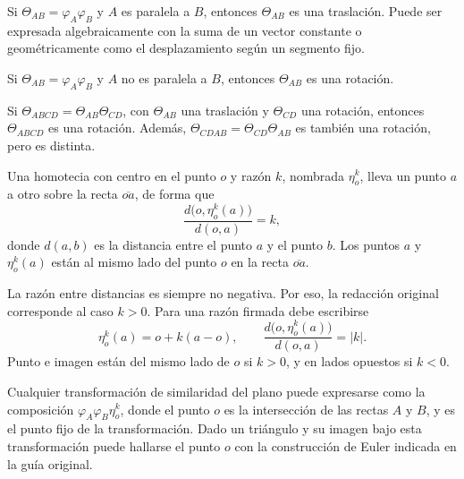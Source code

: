 \begin{enunciado}[Teorema 3]
Si \(\Theta_{AB}=\varphi_A\varphi_B\) y \(A\) es paralela a \(B\), entonces
\(\Theta_{AB}\) es una traslación. Puede ser expresada algebraicamente con la suma de un
vector constante o geométricamente como el desplazamiento según un segmento fijo.
\end{enunciado}

\begin{enunciado}[Teorema 4]
Si \(\Theta_{AB}=\varphi_A\varphi_B\) y \(A\) no es paralela a \(B\), entonces
\(\Theta_{AB}\) es una rotación.
\end{enunciado}

\begin{enunciado}[Teorema 5]
Si \(\Theta_{ABCD}=\Theta_{AB}\Theta_{CD}\), con \(\Theta_{AB}\) una traslación y
\(\Theta_{CD}\) una rotación, entonces \(\Theta_{ABCD}\) es una rotación. Además,
\(\Theta_{CDAB}=\Theta_{CD}\Theta_{AB}\) es también una rotación, pero es distinta.
\end{enunciado}

\begin{enunciado}[Definición 3]
Una homotecia con centro en el punto \(o\) y razón \(k\), nombrada \(\eta_o^k\), lleva un
punto \(a\) a otro sobre la recta \(\overline{oa}\), de forma que
\[
  \frac{d\bigl(o,\eta_o^k(a)\bigr)}{d(o,a)}=k,
\]
donde \(d(a,b)\) es la distancia entre el punto \(a\) y el punto \(b\). Los puntos \(a\) y
\(\eta_o^k(a)\) están al mismo lado del punto \(o\) en la recta \(\overline{oa}\).
\end{enunciado}

\begin{atencion}
La razón entre distancias es siempre no negativa. Por eso, la redacción original corresponde
al caso \(k>0\). Para una razón firmada debe escribirse
\[
\eta_o^k(a)=o+k(a-o),
\qquad
\frac{d\bigl(o,\eta_o^k(a)\bigr)}{d(o,a)}=|k|.
\]
Punto e imagen están del mismo lado de \(o\) si \(k>0\), y en lados opuestos si \(k<0\).
\end{atencion}

\begin{enunciado}[Teorema 6]
Cualquier transformación de similaridad del plano puede expresarse como la composición
\(\varphi_A\varphi_B\eta_o^k\), donde el punto \(o\) es la intersección de las rectas
\(A\) y \(B\), y es el punto fijo de la transformación. Dado un triángulo y su imagen bajo
esta transformación puede hallarse el punto \(o\) con la construcción de Euler indicada en
la guía original.
\end{enunciado}

